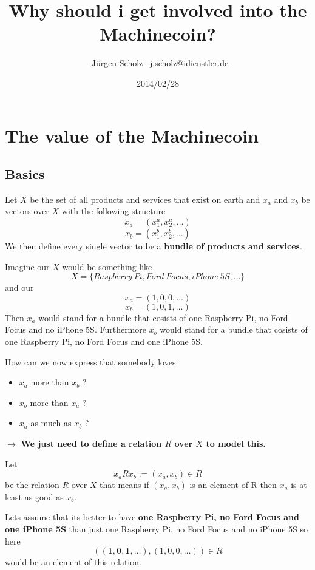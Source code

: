 \documentclass{beamer}
\title{Why should i get involved into the Machinecoin?}
\author{\texorpdfstring{\ Jürgen Scholz \ \newline\url{j.scholz@idienstler.de}}{Author}}
\institute{iDienstler.de $-$ simply make apps and love the\enquote{i}}
\date{2014/02/28}
\begin{document}
\frame{\titlepage}

\section{The value of the Machinecoin}
\subsection{Basics}
\frame
{
 \begin{definition}
   Let $X$ be the set of all products and services that exist on earth and $x_a$ and $x_b$ be vectors over $X$ with the following structure 
   $$x_{a}=(x_{1}^a, x_{2}^a, \dots )$$
   $$x_{b}=(x_{1}^b, x_{2}^b, \dots )$$
   We then define every single vector to be a \textbf{bundle of products and services}. 
 \end{definition}
}
\frame
{
  \begin{example}
   Imagine our $X$ would be something like
   $$X=\{Raspberry\ Pi, Ford\ Focus, iPhone\ 5S, \dots \}$$
   and our 
   $$x_{a}=(1,0,0, \dots)$$
   $$x_{b}=(1,0,1, \dots)$$
   Then $x_{a}$ would stand for a bundle that cosists of one Raspberry Pi, no Ford Focus and no iPhone 5S. Furthermore $x_{b}$ would stand for a bundle that cosists of one Raspberry Pi, no Ford Focus and one iPhone 5S.
 \end{example}
}
\frame
{
  How can we now express that somebody loves 
  \begin{itemize}
  \item $x_{a}$ more than $x_{b}$ ?
  \item $x_{b}$ more than $x_{a}$  ?
  \item $x_{a}$ as much as $x_{b}$ ?
  \end{itemize}
  $\rightarrow$ \textbf{We just need to define a relation $R$ over $X$ to model this.}
}
\frame
{
 \begin{definition}
   Let 
   $$x_{a}Rx_{b}:=(x_{a},x_{b}) \in R$$
   be the relation $R$ over $X$ that means if  $(x_{a},x_{b})$ is an element of R then $x_{a}$ is at least as good as $x_{b}$. 
 \end{definition}
 \begin{example}
 Lets assume that its better to have  \textbf{one Raspberry Pi, no Ford Focus and one iPhone 5S} than just one Raspberry Pi, no Ford Focus and no iPhone 5S so here 
 $$((\textbf{1},\textbf{0},\textbf{1}, \dots),(1,0,0, \dots))\in R$$
 would be an element of this relation.
 \end{example}
}
\end{document}
